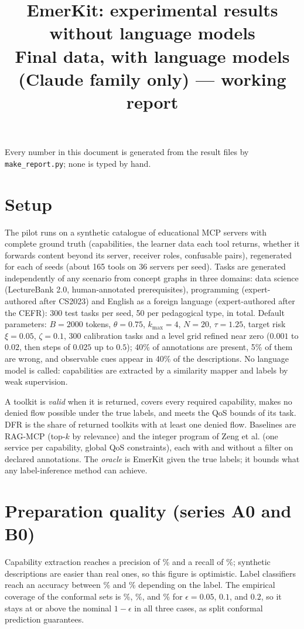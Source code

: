 \documentclass[10pt]{article}
\title{EmerKit: experimental results without language models\\\large Final data, with language models (Claude family only) --- \textcolor{red!60!black}{working report}}
\date{}
\begin{document}
\maketitle

\noindent Every number in this document is generated from the result files by \texttt{make\_report.py}; none is typed by hand.

\section{Setup}
The pilot runs on a synthetic catalogue of educational MCP servers with complete ground truth (capabilities, the learner data each tool returns, whether it forwards content beyond its server, receiver roles, confusable pairs), regenerated for each of \RNSeeds{} seeds (about 165 tools on 36 servers per seed). Tasks are generated independently of any scenario from concept graphs in three domains: data science (LectureBank 2.0, human-annotated prerequisites), programming (expert-authored after CS2023) and English as a foreign language (expert-authored after the CEFR): 300 test tasks per seed, 50 per pedagogical type, \RNTasks{} in total. Default parameters: $B=2000$ tokens, $\theta=0.75$, $k_{\max}=4$, $N=20$, $\tau=1.25$, target risk $\xi=0.05$, $\zeta=0.1$, 300 calibration tasks and a level grid refined near zero ($0.001$ to $0.02$, then steps of $0.025$ up to $0.5$); 40\% of annotations are present, 5\% of them are wrong, and observable cues appear in 40\% of the descriptions. No language model is called: capabilities are extracted by a similarity mapper and labels by weak supervision.

A toolkit is \emph{valid} when it is returned, covers every required capability, makes no denied flow possible under the true labels, and meets the QoS bounds of its task. DFR is the share of returned toolkits with at least one denied flow. Baselines are RAG-MCP (top-$k$ by relevance) and the integer program of Zeng et al. (one service per capability, global QoS constraints), each with and without a filter on declared annotations. The \emph{oracle} is EmerKit given the true labels; it bounds what any label-inference method can achieve.

\section{Preparation quality (series A0 and B0)}
Capability extraction reaches a precision of \RCapPrec\% and a recall of \RCapRec\%; synthetic descriptions are easier than real ones, so this figure is optimistic. Label classifiers reach an accuracy between \RLabAccMin\% and \RLabAccMax\% depending on the label. The empirical coverage of the conformal sets is \RConfCovFive\%, \RConfCovTen\%, and \RConfCovTwenty\% for $\epsilon=0.05$, $0.1$, and $0.2$, so it stays at or above the nominal $1-\epsilon$ in all three cases, as split conformal prediction guarantees.
\end{document}
